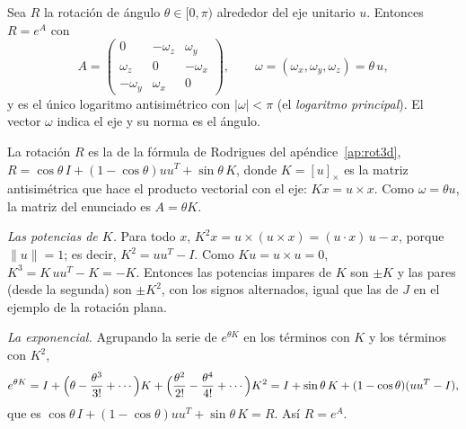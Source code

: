 \begin{proposicion}\label{prop:generador}
Sea \(R\) la rotación de ángulo \(\theta\in[0,\pi)\) alrededor del eje unitario \(u\). Entonces
\(R=e^{A}\) con
\[
A=
\begin{pmatrix}
0&-\omega_z&\omega_y\\
\omega_z&0&-\omega_x\\
-\omega_y&\omega_x&0
\end{pmatrix},
\qquad \omega=(\omega_x,\omega_y,\omega_z)=\theta\,u,
\]
y es el único logaritmo antisimétrico con \(|\omega|<\pi\) (el \emph{logaritmo principal}).
El vector \(\omega\) indica el eje y su norma es el ángulo.
\end{proposicion}

\begin{demostracion}
La rotación \(R\) es la de la fórmula de Rodrigues del apéndice~\ref{ap:rot3d},
\(R=\cos\theta\,I+(1-\cos\theta)uu^T+\sin\theta\,K\), donde \(K=[u]_\times\) es la matriz
antisimétrica que hace el producto vectorial con el eje: \(Kx=u\times x\). Como
\(\omega=\theta u\), la matriz del enunciado es \(A=\theta K\).

\emph{Las potencias de \(K\).} Para todo \(x\), \(K^2x=u\times(u\times x)=(u\cdot x)\,u-x\),
porque \(\|u\|=1\); es decir, \(K^2=uu^T-I\). Como \(Ku=u\times u=0\),
\(K^3=K\,uu^T-K=-K\). Entonces las potencias impares de \(K\) son \(\pm K\) y las pares
(desde la segunda) son \(\pm K^2\), con los signos alternados, igual que las de \(J\) en el
ejemplo de la rotación plana.

\emph{La exponencial.} Agrupando la serie de \(e^{\theta K}\) en los términos con \(K\) y los
términos con \(K^2\),
\[
e^{\theta K}=I+\Bigl(\theta-\frac{\theta^3}{3!}+\cdots\Bigr)K
+\Bigl(\frac{\theta^2}{2!}-\frac{\theta^4}{4!}+\cdots\Bigr)K^2
=I+\sin\theta\,K+(1-\cos\theta)(uu^T-I),
\]
que es \(\cos\theta\,I+(1-\cos\theta)uu^T+\sin\theta\,K=R\). Así \(R=e^{A}\).


\end{demostracion}
